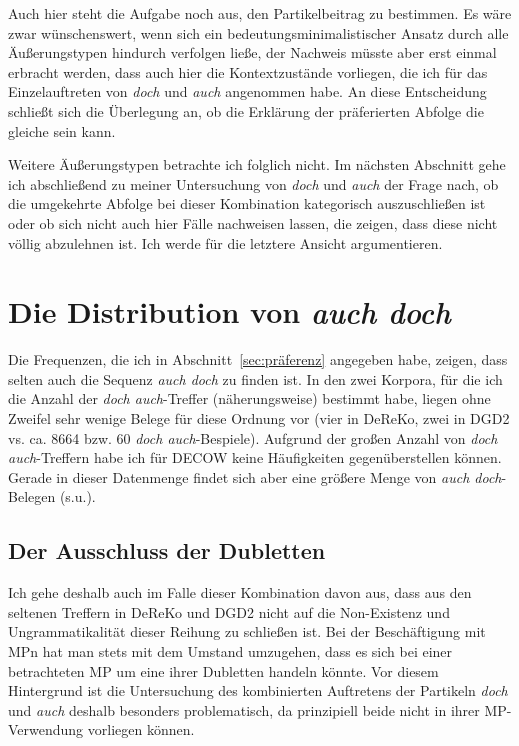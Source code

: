 {Auch hier steht die Aufgabe noch aus, den Partikelbeitrag zu bestimmen. Es wäre zwar wünschenswert, wenn sich ein bedeutungsminimalistischer Ansatz  durch alle Äußerungstypen hindurch verfolgen ließe, der Nachweis müsste aber erst einmal erbracht werden, dass auch hier die Kontextzustände vorliegen, die ich für das Einzelauftreten von \textit{doch} und \textit{auch} angenommen habe. An diese Entscheidung schließt sich die Überlegung an, ob die Erklärung der präferierten Abfolge die gleiche sein kann. 	

Weitere Äußerungstypen betrachte ich folglich nicht. Im nächsten Abschnitt gehe ich abschließend zu meiner Untersuchung von \textit{doch} und \textit{auch} der Frage nach, ob die umgekehrte Abfolge bei dieser Kombination kategorisch auszuschlie\-ßen ist oder ob sich nicht auch hier Fälle nachweisen lassen, die zeigen, dass diese nicht völlig abzulehnen ist. Ich werde für die letztere Ansicht argumentieren.

\section{Die Distribution von \textit{auch doch}}
\label{sec:distributionad}
Die Frequenzen, die ich in Abschnitt~\ref{sec:präferenz} angegeben habe, zeigen, dass selten auch die Sequenz \textit{auch doch} zu finden ist. In den zwei Korpora, für die ich die Anzahl der \textit{doch auch}-Treffer (näherungsweise) bestimmt habe, liegen ohne Zweifel sehr wenige Belege für diese Ordnung vor (vier in DeReKo, zwei in DGD2 vs. ca. 8664 bzw. 60 \textit{doch auch}-Bespiele). Aufgrund der großen Anzahl von \textit{doch auch}-Treffern habe ich für DECOW keine Häufigkeiten gegenüberstellen können. Gerade in dieser Datenmenge findet sich aber eine größere Menge von \textit{auch doch}-Belegen (s.u.).

\subsection{Der Ausschluss der \glq Dubletten\grq {}}
Ich gehe deshalb auch im Falle dieser Kombination davon aus, dass aus den seltenen Treffern in DeReKo und DGD2 nicht auf die Non-Existenz und Ungrammatikalität dieser Reihung zu schließen ist. Bei der Beschäftigung mit MPn hat man stets mit dem Umstand umzugehen, dass es sich bei einer betrachteten \glq MP\grq {} um eine ihrer \glq Dubletten\grq {}  handeln könnte. Vor diesem Hintergrund ist die Untersuchung des kombinierten Auftretens der Partikeln \textit{doch} und \textit{auch} deshalb besonders problematisch, da prinzipiell beide nicht in ihrer MP-Verwendung vorliegen können.

}
